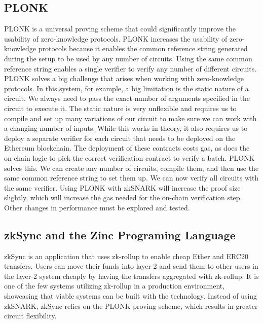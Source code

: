\documentclass[../../thesis.tex]{subfiles}
\begin{document}
\subsection{PLONK}
PLONK \cite{gabizon2019plonk} is a universal proving scheme that could significantly improve the usability of zero-knowledge protocols. PLONK increases the usability of zero-knowledge protocols because it enables the common reference string generated during the setup to be used by any number of circuits. Using the same common reference string enables a single verifier to verify any number of different circuits. PLONK solves a big challenge that arises when working with zero-knowledge protocols. In this system, for example, a big limitation is the static nature of a circuit. We always need to pass the exact number of arguments specified in the circuit to execute it. The static nature is very unflexible and requires us to compile and set up many variations of our circuit to make sure we can work with a changing number of inputs. While this works in theory, it also requires us to deploy a separate verifier for each circuit that needs to be deployed on the Ethereum blockchain. The deployment of these contracts costs gas, as does the on-chain logic to pick the correct verification contract to verify a batch. PLONK solves this. We can create any number of circuits, compile them, and then use the same common reference string to set them up. We can now verify all circuits with the same verifier. Using PLONK with zkSNARK will increase the proof size slightly, which will increase the gas needed for the on-chain verification step. Other changes in performance must be explored and tested. 

\subsection{zkSync and the Zinc Programing Language}
zkSync \cite{zkSync_2019} is an application that uses zk-rollup to enable cheap Ether and ERC20 transfers. Users can move their funds into layer-2 and send them to other users in the layer-2 system cheaply by having the transfers aggregated with zk-rollup. It is one of the few systems utilizing zk-rollup in a production environment, showcasing that viable systems can be built with the technology. Instead of using zkSNARK, zkSync relies on the PLONK proving scheme, which results in greater circuit flexibility. 
\end{document}
